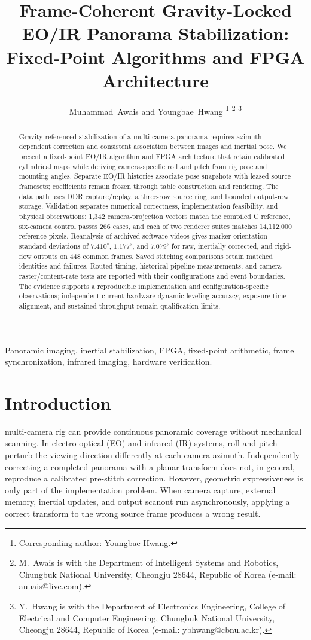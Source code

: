 \documentclass[journal]{IEEEtran}
\title{Frame-Coherent Gravity-Locked EO/IR Panorama Stabilization: Fixed-Point Algorithms and FPGA Architecture}
\author{Muhammad~Awais and Youngbae~Hwang%
\thanks{Corresponding author: Youngbae Hwang.}%
\thanks{M.~Awais is with the Department of Intelligent Systems and Robotics, Chungbuk National University, Cheongju 28644, Republic of Korea (e-mail: auuais@live.com).}%
\thanks{Y.~Hwang is with the Department of Electronics Engineering, College of Electrical and Computer Engineering, Chungbuk National University, Cheongju 28644, Republic of Korea (e-mail: ybhwang@cbnu.ac.kr).}}
\begin{document}
\maketitle
\begin{abstract}
Gravity-referenced stabilization of a multi-camera panorama requires azimuth-dependent correction and consistent association between images and inertial pose. We present a fixed-point EO/IR algorithm and FPGA architecture that retain calibrated cylindrical maps while deriving camera-specific roll and pitch from rig pose and mounting angles. Separate EO/IR histories associate pose snapshots with leased source framesets; coefficients remain frozen through table construction and rendering. The data path uses DDR capture/replay, a three-row source ring, and bounded output-row storage. Validation separates numerical correctness, implementation feasibility, and physical observations: 1,342 camera-projection vectors match the compiled C reference, six-camera control passes 266 cases, and each of two renderer suites matches 14,112,000 reference pixels. Reanalysis of archived software videos gives marker-orientation standard deviations of $7.410^\circ$, $1.177^\circ$, and $7.079^\circ$ for raw, inertially corrected, and rigid-flow outputs on 448 common frames. Saved stitching comparisons retain matched identities and failures. Routed timing, historical pipeline measurements, and camera raster/content-rate tests are reported with their configurations and event boundaries. The evidence supports a reproducible implementation and configuration-specific observations; independent current-hardware dynamic leveling accuracy, exposure-time alignment, and sustained throughput remain qualification limits.
\end{abstract}
\begin{IEEEkeywords}
Panoramic imaging, inertial stabilization, FPGA, fixed-point arithmetic, frame synchronization, infrared imaging, hardware verification.
\end{IEEEkeywords}

\section{Introduction}
 multi-camera rig can provide continuous panoramic coverage without mechanical scanning. In electro-optical (EO) and infrared (IR) systems, roll and pitch perturb the viewing direction differently at each camera azimuth. Independently correcting a completed panorama with a planar transform does not, in general, reproduce a calibrated pre-stitch correction. However, geometric expressiveness is only part of the implementation problem. When camera capture, external memory, inertial updates, and output scanout run asynchronously, applying a correct transform to the wrong source frame produces a wrong result.
\end{document}
